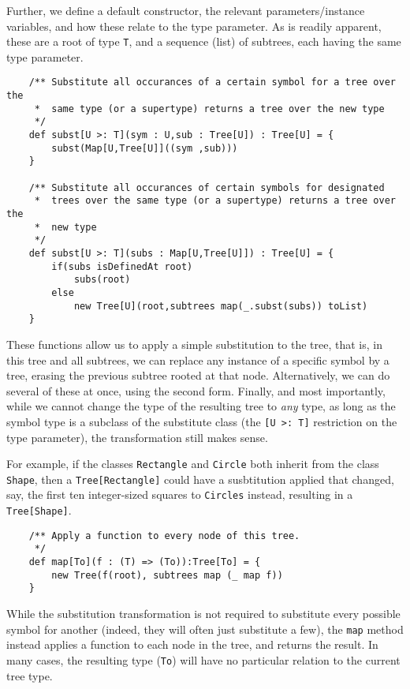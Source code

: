 Further, we define a default constructor, the relevant parameters/instance
variables, and how these relate to the type parameter. As is readily
apparent, these are a root of type \texttt{T}, and a sequence (list) of
subtrees, each having the same type parameter.

\begin{verbatim}
    /** Substitute all occurances of a certain symbol for a tree over the
     *  same type (or a supertype) returns a tree over the new type
     */
    def subst[U >: T](sym : U,sub : Tree[U]) : Tree[U] = {
        subst(Map[U,Tree[U]]((sym ,sub)))
    }

    /** Substitute all occurances of certain symbols for designated 
     *  trees over the same type (or a supertype) returns a tree over the
     *  new type
     */
    def subst[U >: T](subs : Map[U,Tree[U]]) : Tree[U] = {
        if(subs isDefinedAt root)
            subs(root)
        else
            new Tree[U](root,subtrees map(_.subst(subs)) toList)
    }
\end{verbatim}


These functions allow us to apply a simple substitution to the tree, that
is, in this tree and all subtrees, we can replace any instance of a
specific symbol by a tree, erasing the previous subtree rooted at that
node. Alternatively, we can do several of these at once, using the second
form. Finally, and most importantly, while we cannot change the type of the
resulting tree to \emph{any} type, as long as the symbol type is a subclass
of the substitute class (the \texttt{[U >: T]} restriction on the type
parameter), the transformation still makes sense. 

For example, if the classes \texttt{Rectangle} and \texttt{Circle} both
inherit from the class \texttt{Shape}, then a \texttt{Tree[Rectangle]}
could have a susbtitution applied that changed, say, the first ten
integer-sized squares to \texttt{Circles} instead, resulting in a
\texttt{Tree[Shape]}.

\begin{verbatim}    
    /** Apply a function to every node of this tree.
     */
    def map[To](f : (T) => (To)):Tree[To] = {
        new Tree(f(root), subtrees map (_ map f))
    }
\end{verbatim}

While the substitution transformation is not required to substitute every
possible symbol for another (indeed, they will often just substitute a
few), the \texttt{map} method instead applies a function to each node in
the tree, and returns the result. In many cases, the resulting type
(\texttt{To}) will have no particular relation to the current tree type.

